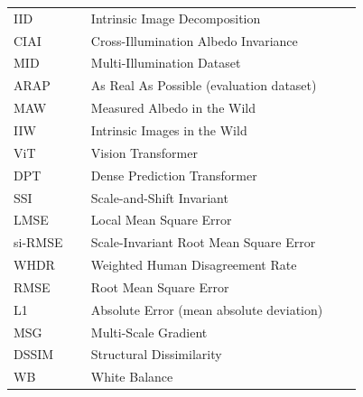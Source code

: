 \begin{longtable}{p{0.2\linewidth} p{0.7\linewidth}}

IID   & Intrinsic Image Decomposition \\
CIAI  & Cross-Illumination Albedo Invariance \\
MID   & Multi-Illumination Dataset \\
ARAP  & As Real As Possible (evaluation dataset) \\
MAW   & Measured Albedo in the Wild \\
IIW   & Intrinsic Images in the Wild \\
ViT   & Vision Transformer \\
DPT   & Dense Prediction Transformer \\
SSI   & Scale-and-Shift Invariant \\
LMSE  & Local Mean Square Error \\
si-RMSE & Scale-Invariant Root Mean Square Error \\
WHDR  & Weighted Human Disagreement Rate \\
RMSE  & Root Mean Square Error \\
L1    & Absolute Error (mean absolute deviation) \\
MSG   & Multi-Scale Gradient \\
DSSIM & Structural Dissimilarity \\
WB    & White Balance \\

\end{longtable}
